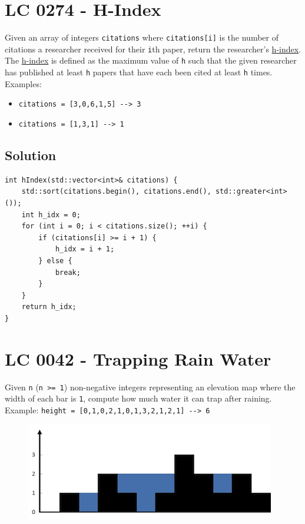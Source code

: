 \section{LC 0274 - H-Index}
Given an array of integers {\colorbox{CodeBackground}{\lstinline|citations|}} where {\colorbox{CodeBackground}{\lstinline|citations[i]|}} is the number of citations a researcher received for their {\colorbox{CodeBackground}{\lstinline|i|}}th paper, return the researcher's \ul{h-index}.\\

The \ul{h-index} is defined as the maximum value of {\colorbox{CodeBackground}{\lstinline|h|}} such that the given researcher has published at least {\colorbox{CodeBackground}{\lstinline|h|}} papers that have each been cited at least {\colorbox{CodeBackground}{\lstinline|h|}} times.\\

Examples:
\begin{itemize}
	\item {\colorbox{CodeBackground}{\lstinline|citations = [3,0,6,1,5] --> 3|}}
	\item {\colorbox{CodeBackground}{\lstinline|citations = [1,3,1] --> 1|}}
\end{itemize}

\subsection*{Solution}
\begin{lstlisting}
int hIndex(std::vector<int>& citations) {
	std::sort(citations.begin(), citations.end(), std::greater<int>());
	int h_idx = 0;
	for (int i = 0; i < citations.size(); ++i) {
		if (citations[i] >= i + 1) {
			h_idx = i + 1;
		} else {
			break;
		}
	}
	return h_idx;
}
\end{lstlisting}

\section{LC 0042 - Trapping Rain Water}
Given {\colorbox{CodeBackground}{\lstinline|n|}} ({\colorbox{CodeBackground}{\lstinline|n >= 1|}}) non-negative integers representing an elevation map where the width of each bar is {\colorbox{CodeBackground}{\lstinline|1|}}, compute how much water it can trap after raining.\\

Example: {\colorbox{CodeBackground}{\lstinline|height = [0,1,0,2,1,0,1,3,2,1,2,1] --> 6|}}
\begin{figure}[H]
\centering
\includegraphics[width=0.4\linewidth]{images/lc0042_eg}
\end{figure}

